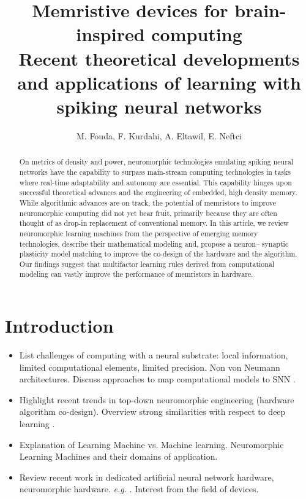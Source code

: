 \documentclass[english]{article}
\renewcommand{\cite}{\citep}
\begin{document}


\title{Memristive devices for brain-inspired computing\\ Recent theoretical developments and applications of learning with spiking neural networks}
\author{M. Fouda, F. Kurdahi, A. Eltawil, E. Neftci}
\maketitle

\begin{abstract}
On metrics of density and power, neuromorphic technologies emulating spiking neural networks have the capability to surpass main-stream computing technologies in tasks where real-time adaptability and autonomy are essential.
This capability hinges upon successful theoretical advances and the engineering of embedded, high density memory.
While algorithmic advances are on track, the potential of memristors to improve neuromorphic computing did not yet bear fruit, primarily because they are often thought of as drop-in replacement of conventional memory.
In this article, we review neuromorphic learning machines from the perspective of emerging memory technologies, describe their mathematical modeling and, propose a neuron-- synaptic plasticity model matching to improve the co-design of the hardware and the algorithm.
Our findings suggest that multifactor learning rules derived from computational modeling can vastly improve the performance of memristors in hardware.
\end{abstract}

\section{Introduction}
\begin{itemize}
  \item List challenges of computing with a neural substrate: local information, limited computational elements, limited precision. Non von Neumann architectures. Discuss approaches to map computational models to SNN \cite{Neftci18_datapowe}.  
  \item Highlight recent trends in top-down neuromorphic engineering (hardware algorithm co-design). Overview strong similarities with respect to deep learning \cite{Neftci18_datapowe}. 
  \item Explanation of Learning Machine vs. Machine learning. Neuromorphic Learning Machines and their domains of application. 
  \item Review recent work in dedicated artificial neural network hardware, neuromorphic hardware. \emph{e.g.} \cite{Jouppi_etal17_in-dperf}. Interest from the field of devices.
\end{itemize}
\end{document}
